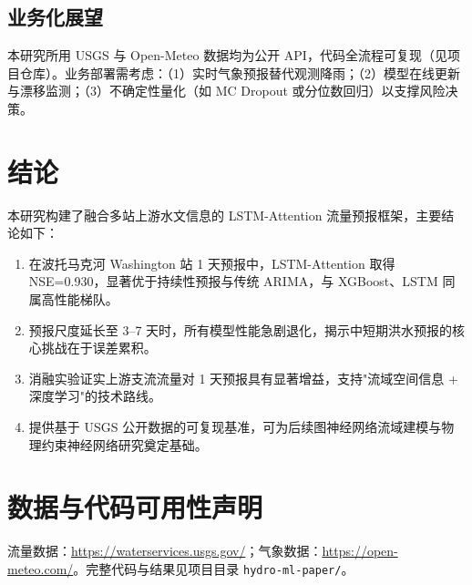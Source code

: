 \documentclass[12pt,a4paper]{article}
\begin{document}
\subsection{业务化展望}

本研究所用 USGS 与 Open-Meteo 数据均为公开 API，代码全流程可复现（见项目仓库）。业务部署需考虑：（1）实时气象预报替代观测降雨；（2）模型在线更新与漂移监测；（3）不确定性量化（如 MC Dropout 或分位数回归）以支撑风险决策。

\section{结论}

本研究构建了融合多站上游水文信息的 LSTM-Attention 流量预报框架，主要结论如下：

\begin{enumerate}
  \item 在波托马克河 Washington 站 1 天预报中，LSTM-Attention 取得 NSE=0.930，显著优于持续性预报与传统 ARIMA，与 XGBoost、LSTM 同属高性能梯队。
  \item 预报尺度延长至 3--7 天时，所有模型性能急剧退化，揭示中短期洪水预报的核心挑战在于误差累积。
  \item 消融实验证实上游支流流量对 1 天预报具有显著增益，支持"流域空间信息 + 深度学习"的技术路线。
  \item 提供基于 USGS 公开数据的可复现基准，可为后续图神经网络流域建模与物理约束神经网络研究奠定基础。
\end{enumerate}

\section*{数据与代码可用性声明}

流量数据：\url{https://waterservices.usgs.gov/}；气象数据：\url{https://open-meteo.com/}。完整代码与结果见项目目录 \texttt{hydro-ml-paper/}。
\end{document}
